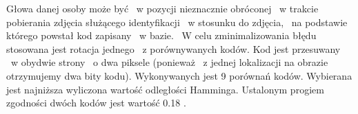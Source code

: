 Głowa danej osoby może być ~w pozycji nieznacznie obróconej ~w trakcie pobierania zdjęcia służącego identyfikacji ~w stosunku do zdjęcia, ~na podstawie  którego powstał kod zapisany  ~w bazie. ~W celu zminimalizowania błędu stosowana jest rotacja jednego ~z porównywanych kodów. Kod jest przesuwany ~w obydwie strony ~o dwa piksele (ponieważ ~z jednej lokalizacji na obrazie otrzymujemy dwa bity kodu). Wykonywanych jest 9 porównań kodów. Wybierana jest najniższa wyliczona wartość odległości Hamminga. Ustalonym progiem zgodności dwóch kodów jest wartość 0.18 \cite{Daugman}.

